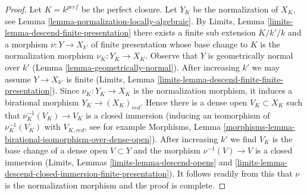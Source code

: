 \documentclass[10pt,a4paper]{amsart}
\theoremstyle{plain}
\theoremstyle{definition}
\theoremstyle{remark}
\numberwithin{equation}{subsection}
\begin{document}
\begin{proof}
Let $K = k^{perf}$ be the perfect closure. Let $Y_K$ be the
normalization of $X_K$, see Lemma \ref{lemma-normalization-locally-algebraic}.
By Limits, Lemma \ref{limits-lemma-descend-finite-presentation}
there exists a finite sub extension $K/k'/k$ and a morphism
$\nu : Y \to X_{k'}$ of finite presentation whose base change to $K$
is the normalization morphism $\nu_K : Y_K \to X_K$.
Observe that $Y$ is geometrically normal over $k'$
(Lemma \ref{lemma-geometrically-normal}).
After increasing $k'$ we may assume $Y \to X_{k'}$ is finite
(Limits, Lemma \ref{limits-lemma-descend-finite-finite-presentation}).
Since $\nu_K : Y_K \to X_K$ is the normalization morphism,
it induces a birational morphism $Y_K \to (X_K)_{red}$.
Hence there is a dense open $V_K \subset X_K$ such that
$\nu_K^{-1}(V_K) \to V_K$ is a closed immersion
(inducing an isomorphism of $\nu_K^{-1}(V_K)$ with $V_{K, red}$, see
for example Morphisms, Lemma
\ref{morphisms-lemma-birational-isomorphism-over-dense-open}).
After increasing $k'$ we find $V_K$ is the base change of a dense open
$V \subset Y$ and the morphism $\nu^{-1}(V) \to V$ is a closed immersion
(Limits, Lemmas \ref{limits-lemma-descend-opens} and
\ref{limits-lemma-descend-closed-immersion-finite-presentation}).
It follows readily from this that $\nu$ is the normalization
morphism and the proof is complete.
\end{proof}
\end{document}
